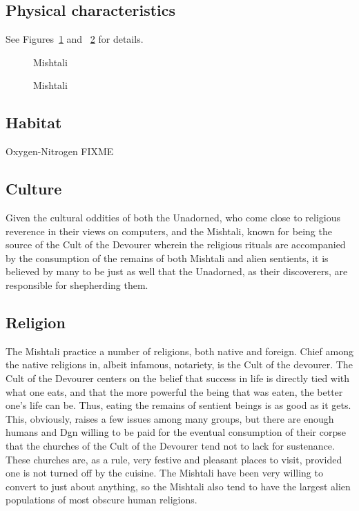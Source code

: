 \subsection{Physical characteristics}
See Figures~\ref{fig:Mishtali} and ~\ref{fig:Mishtali1} for details.

\begin{figure}
\begin{center}
    \caption{Mishtali}
    \label{fig:Mishtali}
\end{center}
\end{figure}
\begin{figure}
\begin{center}
    \caption{Mishtali}
    \label{fig:Mishtali1}
\end{center}
\end{figure}


\subsection{Habitat}
Oxygen-Nitrogen FIXME 

\subsection{Culture}
Given the cultural oddities of both the Unadorned, who come close to
religious reverence in their views on computers, and the Mishtali,
known for being the source of the Cult of the Devourer wherein the
religious rituals are accompanied by the consumption of the remains of
both Mishtali and alien sentients, it is believed by many to be just
as well that the Unadorned, as their discoverers, are responsible for
shepherding them.

\subsection{Religion}

The Mishtali practice a number of religions, both native and
foreign. Chief among the native religions in, albeit infamous,
notariety, is the Cult of the devourer. The Cult of the Devourer
centers on the belief that success in life is directly tied with what
one eats, and that the more powerful the being that was eaten, the
better one's life can be. Thus, eating the remains of sentient beings
is as good as it gets. This, obviously, raises a few issues among many
groups, but there are enough humans and Dgn willing to be paid for the
eventual consumption of their corpse that the churches of the Cult of
the Devourer tend not to lack for sustenance. These churches are, as a
rule, very festive and pleasant places to visit, provided one is not
turned off by the cuisine. The Mishtali have been very willing to
convert to just about anything, so the Mishtali also tend to have the
largest alien populations of most obscure human religions.

